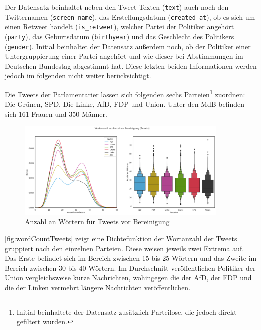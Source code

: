 Der Datensatz beinhaltet neben den Tweet-Texten (\texttt{text}) auch noch den Twitternamen (\texttt{screen\_name}), das Erstellungsdatum (\texttt{created\_at}), ob es sich um einen Retweet handelt (\texttt{is\_retweet}), welcher Partei der Politiker angehört (\texttt{party}), das Geburtsdatum (\texttt{birthyear}) und das Geschlecht des Politikers (\texttt{gender}). Initial beinhaltet der Datensatz außerdem noch, ob der Politiker einer Untergruppierung einer Partei angehört und wie dieser bei Abstimmungen im Deutschen Bundestag abgestimmt hat. Diese letzten beiden Informationen werden jedoch im folgenden nicht weiter berücksichtigt.

Die Tweets der Parlamentarier lassen sich folgenden sechs Parteien\footnote{Initial beinhaltete der Datensatz zusätzlich Parteilose, die jedoch direkt gefiltert wurden.} zuordnen: Die Grünen, \ac{SPD}, Die Linke, \ac{AfD}, \ac{FDP} und Union. Unter den \ac{MdB} befinden sich \num{161} Frauen und \num{350} Männer.


\begin{figure}[H]
    \centering
    \includegraphics[width=0.9\textwidth]{data/images/tweets/wortanzahl_pro_partei_vor_bereinigung.png}
    \caption{Anzahl an Wörtern für Tweets vor Bereinigung} \label{fig:wordCountTweets}
\end{figure}


\autoref{fig:wordCountTweets} zeigt eine Dichtefunktion der Wortanzahl der Tweets gruppiert nach den einzelnen Parteien. Diese weisen jeweils zwei Extrema auf. Das Erste befindet sich im Bereich zwischen \num{15} bis \num{25} Wörtern und das Zweite im Bereich zwischen \num{30} bis \num{40} Wörtern. Im Durchschnitt veröffentlichen Politiker der Union vergleichsweise kurze Nachrichten, wohingegen die der \ac{AfD}, der \ac{FDP} und die der Linken vermehrt längere Nachrichten veröffentlichen.

